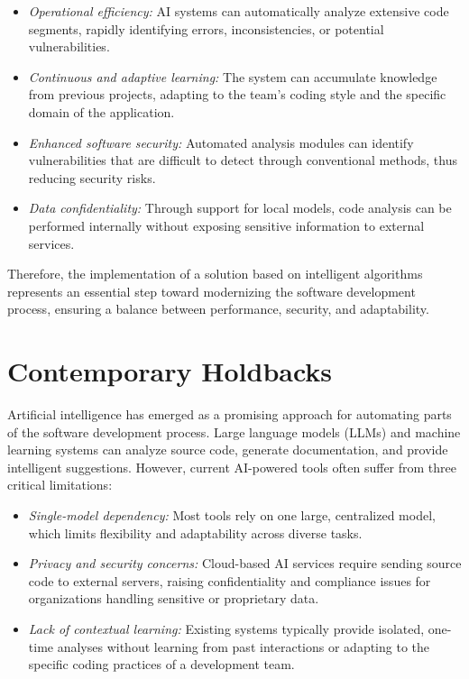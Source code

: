 \documentclass[12pt,a4paper]{article}
\begin{document}
\begin{itemize}[leftmargin=1.5em]
    \item \textit{Operational efficiency:} AI systems can automatically analyze extensive code segments, rapidly 
    identifying errors, inconsistencies, or potential vulnerabilities.
    \item \textit{Continuous and adaptive learning:} The system can accumulate knowledge from previous projects, 
    adapting to the team’s coding style and the specific domain of the application.
    \item \textit{Enhanced software security:} Automated analysis modules can identify vulnerabilities that are 
    difficult to detect through conventional methods, thus reducing security risks.
    \item \textit{Data confidentiality:} Through support for local models, code analysis can be performed internally 
    without exposing sensitive information to external services.
\end{itemize}

Therefore, the implementation of a solution based on intelligent algorithms represents an essential step toward 
modernizing the software development process, ensuring a balance between performance, security, and adaptability.

\section{Contemporary Holdbacks}

Artificial intelligence has emerged as a promising approach for automating parts of the software development process. 
Large language models (LLMs) and machine learning systems can analyze source code, generate documentation, and provide 
intelligent suggestions. However, current AI-powered tools often suffer from three critical limitations:

\begin{itemize}[leftmargin=1.5em]
    \item \textit{Single-model dependency:} Most tools rely on one large, centralized model, which limits flexibility 
    and adaptability across diverse tasks.
    \item \textit{Privacy and security concerns:} Cloud-based AI services require sending source code to external 
    servers, raising confidentiality and compliance issues for organizations handling sensitive or proprietary data.
    \item \textit{Lack of contextual learning:} Existing systems typically provide isolated, one-time analyses without 
    learning from past interactions or adapting to the specific coding practices of a development team.
\end{itemize}
\end{document}
